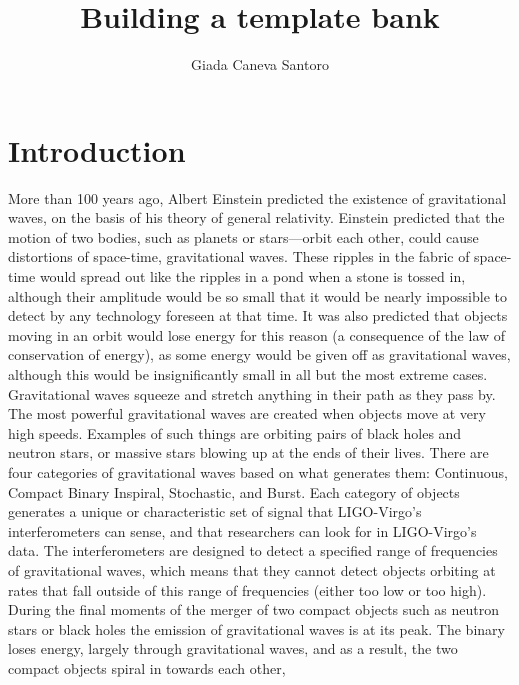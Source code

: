 \documentclass[binding=0.6cm, LaM]{sapthesis}
\title{Building a template bank}
\author{Giada Caneva Santoro}
\begin{document}
\frontmatter
\maketitle
\dedication{Fortsett å gå.}


\tableofcontents

\mainmatter 

\chapter{Introduction}

	More than 100 years ago, Albert Einstein predicted the existence of gravitational waves,
	on the basis of his theory of general relativity.  
	Einstein predicted that the motion of two bodies, such as planets or stars—orbit each other,
	could cause distortions of space-time, gravitational waves.
	These ripples in the fabric of space-time would spread out like the ripples in a pond when a stone is tossed in,
	although their amplitude would be so small that it would be nearly impossible to detect by any technology foreseen at that time.
	It was also predicted that objects moving in an orbit would lose energy for this reason 
	(a consequence of the law of conservation of energy), as some energy would be given off as gravitational waves, 
	although this would be insignificantly small in all but the most extreme cases.
	Gravitational waves squeeze and stretch anything in their path as they pass by.
	The most powerful gravitational waves are created when objects move at very high speeds. 
	Examples of such things are orbiting pairs of black holes and neutron stars, 
	or massive stars blowing up at the ends of their lives.
	There are four categories of gravitational waves based on what generates them: 
	Continuous, Compact Binary Inspiral, Stochastic, and Burst. 	
	Each category of objects generates a unique or characteristic set of signal 
	that LIGO-Virgo's interferometers can sense, and that researchers can look for in LIGO-Virgo’s data.
        The interferometers are designed to detect a specified range of frequencies of gravitational waves,
        which means that they cannot detect objects orbiting at rates that fall outside of this range of frequencies 
        (either too low or too high). During the final moments of the merger of two compact objects such as neutron stars 
	or black holes the emission of gravitational waves is at its peak. The binary loses energy, 
	largely through gravitational waves, and as a result, the two compact objects spiral in towards each other, 
\end{document}
